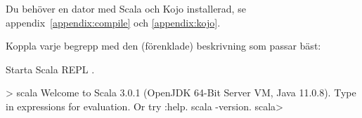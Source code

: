 
\ifPreSolution
\Exercise{\ExeWeekONE}\label{exe:W01}

\begin{Goals}

\end{Goals}

\begin{Preparations}
\item {}
\item Du behöver en dator med Scala och Kojo installerad, se appendix~\ref{appendix:compile} och  \ref{appendix:kojo}.
\end{Preparations}

\else

\ExerciseSolution{\ExeWeekONE}

\fi  %


\BasicTasks





\QUESTBEGIN

\Task \what

\vspace{1em}\noindent Koppla varje begrepp med den (förenklade) beskrivning som passar bäst:

\begin{ConceptConnections}

\end{ConceptConnections}

\SOLUTION

\TaskSolved \what

\begin{ConceptConnections}

\end{ConceptConnections}

\QUESTEND







\QUESTBEGIN

\Task \what

\vspace{1em}\noindent Starta Scala REPL .

\begin{REPLnonum}
> scala
Welcome to Scala 3.0.1 (OpenJDK 64-Bit Server VM, Java 11.0.8).
Type in expressions for evaluation. Or try :help.
scala -version.
scala>
\end{REPLnonum}


